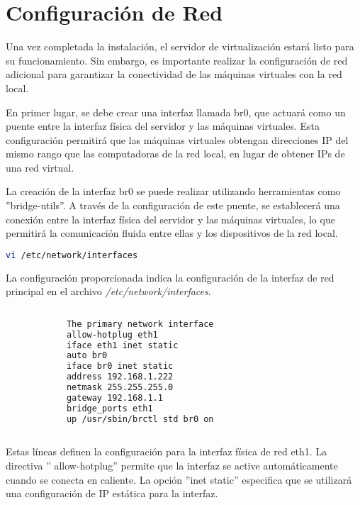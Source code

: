 		
	\section{Conﬁguración de Red}
	
		Una vez completada la instalación, el servidor de virtualización estará listo para su funcionamiento. Sin embargo, es importante realizar la configuración de red adicional para garantizar la conectividad de las máquinas virtuales con la red local.\par
	
		En primer lugar, se debe crear una interfaz llamada br0, que actuará como un puente entre la interfaz física del servidor y las máquinas virtuales. Esta configuración permitirá que las máquinas virtuales obtengan direcciones IP del mismo rango que las computadoras de la red local, en lugar de obtener IPs de una red virtual.\par
	
		La creación de la interfaz br0 se puede realizar utilizando herramientas como ''bridge-utils''. A través de la configuración de este puente, se establecerá una conexión entre la interfaz física del servidor y las máquinas virtuales, lo que permitirá la comunicación fluida entre ellas y los dispositivos de la red local.\par
	
		\begin{lstlisting}[language=Bash, caption=Interfaces]
		vi /etc/network/interfaces
		\end{lstlisting}
		
			
		La configuración proporcionada indica la configuración de la interfaz de red principal en el archivo \textit{/etc/network/interfaces}.
		
		\begin{lstlisting}[language=Bash, caption=Configuración de red]
			
			The primary network interface
			allow-hotplug eth1
			iface eth1 inet static
			auto br0
			iface br0 inet static
			address 192.168.1.222
			netmask 255.255.255.0
			gateway 192.168.1.1
			bridge_ports eth1
			up /usr/sbin/brctl std br0 on
			
		\end{lstlisting}			

		
		
		Estas líneas definen la configuración para la interfaz física de red eth1. La directiva '' allow-hotplug'' permite que la interfaz se active automáticamente cuando se conecta en caliente. La opción ''inet static'' especifica que se utilizará una configuración de IP estática para la interfaz.\par
				
